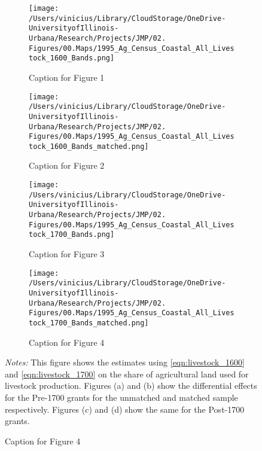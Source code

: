 \documentclass[11pt]{article}
\begin{document}
\clearpage


\clearpage

\begin{landscape}
  \begin{figure}[htbp]
    \caption{Effects of Coastal Ban on Livestock with Varying Cutoffs on Livestock Area}
    \centering
    \begin{subfigure}[b]{0.65\textwidth}
        \centering
        \texttt{[image: /Users/vinicius/Library/CloudStorage/OneDrive-UniversityofIllinois-Urbana/Research/Projects/JMP/02. Figures/00.Maps/1995\_Ag\_Census\_Coastal\_All\_Livestock\_1600\_Bands.png]}
        \caption{Caption for Figure 1}
    \end{subfigure}
    \hfill
    \begin{subfigure}[b]{0.65\textwidth}
        \centering
        \texttt{[image: /Users/vinicius/Library/CloudStorage/OneDrive-UniversityofIllinois-Urbana/Research/Projects/JMP/02. Figures/00.Maps/1995\_Ag\_Census\_Coastal\_All\_Livestock\_1600\_Bands\_matched.png]}
        \caption{Caption for Figure 2}
    \end{subfigure}

    \vspace{0.1cm} %

    \begin{subfigure}[b]{0.65\textwidth}
        \centering
        \texttt{[image: /Users/vinicius/Library/CloudStorage/OneDrive-UniversityofIllinois-Urbana/Research/Projects/JMP/02. Figures/00.Maps/1995\_Ag\_Census\_Coastal\_All\_Livestock\_1700\_Bands.png]}
        \caption{Caption for Figure 3}
    \end{subfigure}
    \hfill
    \begin{subfigure}[b]{0.65\textwidth}
        \centering
        \texttt{[image: /Users/vinicius/Library/CloudStorage/OneDrive-UniversityofIllinois-Urbana/Research/Projects/JMP/02. Figures/00.Maps/1995\_Ag\_Census\_Coastal\_All\_Livestock\_1700\_Bands\_matched.png]}
        \caption{Caption for Figure 4}
    \end{subfigure}

    \vspace{0.5cm}
    \justifying
    \noindent \textit{Notes:} This figure shows the estimates using \autoref{eqn:livestock_1600} and \autoref{eqn:livestock_1700} on the share of agricultural land used for livestock production. Figures (a) and (b) show the differential effects for the Pre-1700 grants for the unmatched and matched sample respectively. Figures (c) and (d) show the same for the Post-1700 grants.
    \label{fig:robustness_all_distance_cutoff}
    
\end{figure}
\end{landscape}
\end{document}
